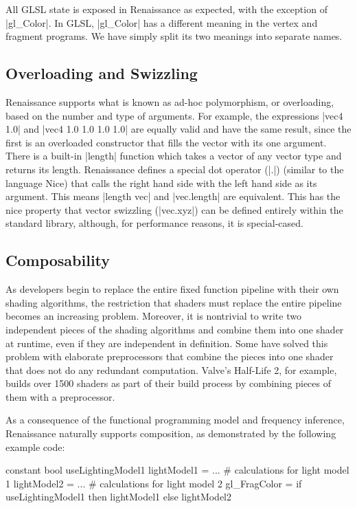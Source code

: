 \documentclass[review]{acmsiggraph}      %
\begin{document}
All GLSL state is exposed in Renaissance as expected, with the
exception of |gl_Color|.  In GLSL, |gl_Color| has a different meaning
in the vertex and fragment programs.  We have simply split its two
meanings into separate names.


\subsection{Overloading and Swizzling}

Renaissance supports what is known as ad-hoc polymorphism, or
overloading, based on the number and type of arguments.  For example,
the expressions |vec4 1.0| and |vec4 1.0 1.0 1.0 1.0| are equally
valid and have the same result, since the first is an overloaded
constructor that fills the vector with its one argument.  There is a
built-in |length| function which takes a vector of any vector type and
returns its length.  Renaissance defines a special dot operator (|.|)
(similar to the language Nice) that calls the right hand side with the
left hand side as its argument.  This means |length vec| and
|vec.length| are equivalent.  This has the nice property that vector
swizzling (|vec.xyz|) can be defined entirely within the standard
library, although, for performance reasons, it is special-cased.


\subsection{Composability}

As developers begin to replace the entire fixed function pipeline with
their own shading algorithms, the restriction that shaders must
replace the entire pipeline becomes an increasing problem.  Moreover,
it is nontrivial to write two independent pieces of the shading
algorithms and combine them into one shader at runtime, even if they
are independent in definition.  Some have solved this problem with
elaborate preprocessors that combine the pieces into one shader that
does not do any redundant computation.  Valve's Half-Life 2, for
example, builds over 1500 shaders as part of their build process by
combining pieces of them with a preprocessor.

As a consequence of the functional programming model and frequency
inference, Renaissance naturally supports composition, as demonstrated
by the following example code:

\begin{MyVerb}
constant bool useLightingModel1
lightModel1 = ...  # calculations for light model 1
lightModel2 = ...  # calculations for light model 2
gl_FragColor = if useLightingModel1 then lightModel1 
                                    else lightModel2
\end{MyVerb}
\end{document}
